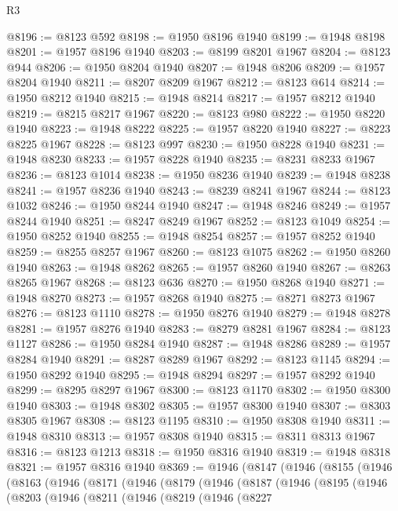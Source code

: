 \begin{lexlean}{R3}
\begin{coremodule}
@8196 := @8123 @592
@8198 := @1950 @8196 @1940
@8199 := @1948 @8198
@8201 := @1957 @8196 @1940
@8203 := @8199 @8201 @1967
@8204 := @8123 @944
@8206 := @1950 @8204 @1940
@8207 := @1948 @8206
@8209 := @1957 @8204 @1940
@8211 := @8207 @8209 @1967
@8212 := @8123 @614
@8214 := @1950 @8212 @1940
@8215 := @1948 @8214
@8217 := @1957 @8212 @1940
@8219 := @8215 @8217 @1967
@8220 := @8123 @980
@8222 := @1950 @8220 @1940
@8223 := @1948 @8222
@8225 := @1957 @8220 @1940
@8227 := @8223 @8225 @1967
@8228 := @8123 @997
@8230 := @1950 @8228 @1940
@8231 := @1948 @8230
@8233 := @1957 @8228 @1940
@8235 := @8231 @8233 @1967
@8236 := @8123 @1014
@8238 := @1950 @8236 @1940
@8239 := @1948 @8238
@8241 := @1957 @8236 @1940
@8243 := @8239 @8241 @1967
@8244 := @8123 @1032
@8246 := @1950 @8244 @1940
@8247 := @1948 @8246
@8249 := @1957 @8244 @1940
@8251 := @8247 @8249 @1967
@8252 := @8123 @1049
@8254 := @1950 @8252 @1940
@8255 := @1948 @8254
@8257 := @1957 @8252 @1940
@8259 := @8255 @8257 @1967
@8260 := @8123 @1075
@8262 := @1950 @8260 @1940
@8263 := @1948 @8262
@8265 := @1957 @8260 @1940
@8267 := @8263 @8265 @1967
@8268 := @8123 @636
@8270 := @1950 @8268 @1940
@8271 := @1948 @8270
@8273 := @1957 @8268 @1940
@8275 := @8271 @8273 @1967
@8276 := @8123 @1110
@8278 := @1950 @8276 @1940
@8279 := @1948 @8278
@8281 := @1957 @8276 @1940
@8283 := @8279 @8281 @1967
@8284 := @8123 @1127
@8286 := @1950 @8284 @1940
@8287 := @1948 @8286
@8289 := @1957 @8284 @1940
@8291 := @8287 @8289 @1967
@8292 := @8123 @1145
@8294 := @1950 @8292 @1940
@8295 := @1948 @8294
@8297 := @1957 @8292 @1940
@8299 := @8295 @8297 @1967
@8300 := @8123 @1170
@8302 := @1950 @8300 @1940
@8303 := @1948 @8302
@8305 := @1957 @8300 @1940
@8307 := @8303 @8305 @1967
@8308 := @8123 @1195
@8310 := @1950 @8308 @1940
@8311 := @1948 @8310
@8313 := @1957 @8308 @1940
@8315 := @8311 @8313 @1967
@8316 := @8123 @1213
@8318 := @1950 @8316 @1940
@8319 := @1948 @8318
@8321 := @1957 @8316 @1940
@8369 := @1946
    (@8147
      (@1946
        (@8155
          (@1946
            (@8163
              (@1946
                (@8171
                  (@1946
                    (@8179
                      (@1946
                        (@8187
                          (@1946
                            (@8195
                              (@1946
                                (@8203
                                  (@1946
                                    (@8211
                                      (@1946
                                        (@8219
                                          (@1946
                                            (@8227

\end{coremodule}
\end{lexlean}
